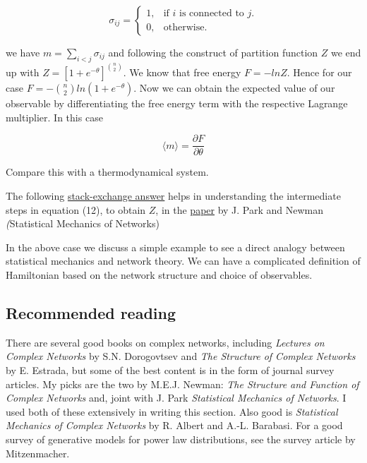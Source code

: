 $$
    \sigma_{ij} = \begin{cases}
    1, & \text{if $i$ is connected to $j$}.\\
    0, & \text{otherwise}.
  \end{cases}
$$

we have $m = \sum_{i<j} \sigma_{ij}$ and following the construct of partition function $Z$ we end up with $Z = [1 + e^{-\theta}]^{\binom{n}{2}}$. We know that free energy $F = -ln Z$. Hence for our case $F = -\binom{n}{2} ln(1 + e^{-\theta})$. Now we can obtain the expected value of our observable by differentiating the free energy term with the respective Lagrange multiplier. In this case 

$$
   \langle m \rangle = \frac{\partial F}{\partial \theta}
$$

Compare this with a thermodynamical system.

The following \href{https://math.stackexchange.com/questions/705945/how-to-interchange-a-sum-and-a-product}{stack-exchange answer} helps in understanding the intermediate steps in equation (12), to obtain $Z$, in the  \href{https://arxiv.org/pdf/cond-mat/0405566.pdf}{paper} by J. Park and Newman \emph(Statistical Mechanics of Networks)

In the above case we discuss a simple example to see a direct analogy between statistical mechanics and network theory. We can have a complicated definition of Hamiltonian based on the network structure and choice of observables.
\subsection{Recommended reading}
There are several good books on complex networks, including \emph{Lectures on Complex Networks} by S.N. Dorogovtsev and \emph{The Structure of Complex Networks} by E. Estrada, but some of the best content is in the form of journal survey articles. My picks are the two by M.E.J. Newman: \emph{The Structure and Function of Complex Networks} and, joint with J. Park \emph{Statistical Mechanics of Networks}. I used both of these extensively in writing this section. Also good is \emph{Statistical Mechanics of Complex Networks} by R. Albert and A.-L. Barabasi. For a good survey of generative models for power law distributions, see the survey article by Mitzenmacher.


